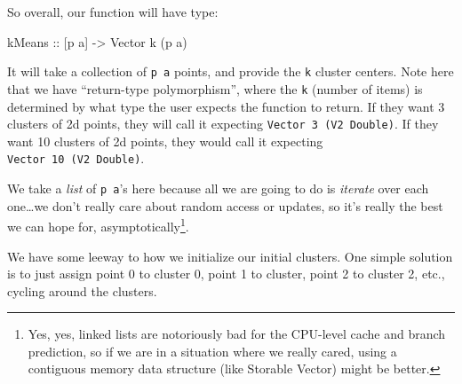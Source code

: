 \documentclass[]{article}
\newenvironment{Shaded}{}{}
\newcommand{\CommentTok}[1]{\textcolor[rgb]{0.38,0.63,0.69}{\textit{#1}}}
\newcommand{\DataTypeTok}[1]{\textcolor[rgb]{0.56,0.13,0.00}{#1}}
\newcommand{\DecValTok}[1]{\textcolor[rgb]{0.25,0.63,0.44}{#1}}
\newcommand{\FunctionTok}[1]{\textcolor[rgb]{0.02,0.16,0.49}{#1}}
\newcommand{\KeywordTok}[1]{\textcolor[rgb]{0.00,0.44,0.13}{\textbf{#1}}}
\newcommand{\NormalTok}[1]{#1}
\newcommand{\OperatorTok}[1]{\textcolor[rgb]{0.40,0.40,0.40}{#1}}
\newcommand{\OtherTok}[1]{\textcolor[rgb]{0.00,0.44,0.13}{#1}}
\begin{document}
So overall, our function will have type:

\begin{Shaded}
\begin{Highlighting}[]
\OtherTok{kMeans ::}\NormalTok{ [p a] }\OtherTok{{-}\textgreater{}} \DataTypeTok{Vector}\NormalTok{ k (p a)}
\end{Highlighting}
\end{Shaded}

It will take a collection of \texttt{p\ a} points, and provide the \texttt{k}
cluster centers. Note here that we have ``return-type polymorphism'', where the
\texttt{k} (number of items) is determined by what type the user expects the
function to return. If they want 3 clusters of 2d points, they will call it
expecting \texttt{Vector\ 3\ (V2\ Double)}. If they want 10 clusters of 2d
points, they would call it expecting \texttt{Vector\ 10\ (V2\ Double)}.

We take a \emph{list} of \texttt{p\ a}'s here because all we are going to do is
\emph{iterate} over each one\ldots we don't really care about random access or
updates, so it's really the best we can hope for, asymptotically\footnote{Yes,
  yes, linked lists are notoriously bad for the CPU-level cache and branch
  prediction, so if we are in a situation where we really cared, using a
  contiguous memory data structure (like Storable Vector) might be better.}.

We have some leeway to how we initialize our initial clusters. One simple
solution is to just assign point 0 to cluster 0, point 1 to cluster, point 2 to
cluster 2, etc., cycling around the clusters.

\begin{Shaded}
\end{Shaded}
\end{document}
